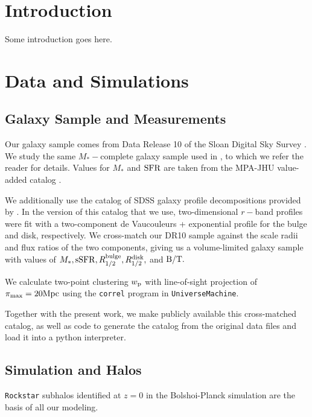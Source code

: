 \documentclass[usenatbib,usegraphicx,letterpaper]{mn2e}
\newcommand{\rhalfdisk}{R_{1/2}^{\rm disk}}
\newcommand{\rhalfbulge}{R_{1/2}^{\rm bulge}}
\newcommand{\bt}{{\rm B/T}}
\newcommand{\mstar}{M_{\ast}}
\newcommand{\ssfr}{{\rm sSFR}}
\newcommand{\sfr}{{\rm SFR}}
\newcommand{\wproj}{w_{\rm p}}
\newcommand{\mpc}{{\rm Mpc}}
\begin{document}
\section{Introduction}
\label{sec:intro}
Some introduction goes here.

\section{Data and Simulations}
\label{sec:data}

\subsection{Galaxy Sample and Measurements}
\label{subsec:galaxydata}


Our galaxy sample comes from Data Release 10 of the Sloan Digital Sky Survey \citep[SDSS][]{ahn_etal14}. We study the same $\mstar-$complete galaxy sample used in \citet{behroozi_etal15}, to which we refer the reader for details. Values for $\mstar$ and $\sfr$ are taken from the MPA-JHU value-added catalog \citep{kauffmann_etal03,brinchmann_etal04}. 

We additionally use the catalog of SDSS galaxy profile decompositions provided by \citet{meert_etal15}. In the version of this catalog that we use, two-dimensional $r-$band profiles were fit with a two-component de Vaucouleurs + exponential profile for the bulge and disk, respectively. We cross-match our DR10 sample against the \citet{meert_etal15} scale radii and flux ratios of the two components, giving us a volume-limited galaxy sample with values of $\mstar,\ssfr,\rhalfbulge,\rhalfdisk,$ and $\bt.$ 

We calculate two-point clustering $\wproj$ with line-of-sight projection of $\pi_{\rm max}=20\mpc$ using the {\tt correl} program in {\tt UniverseMachine}. 

Together with the present work, we make publicly available this cross-matched catalog, as well as code to generate the catalog from the original data files and load it into a python interpreter. 



\subsection{Simulation and Halos}
\label{subsec:sim}

{\tt Rockstar} subhalos identified at $z=0$ in the Bolshoi-Planck simulation are the basis of all our modeling. 
\end{document}
